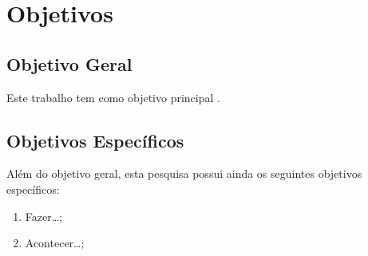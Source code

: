 %
%

\chapter{Objetivos}\label{cap_objetivos}

\section{Objetivo Geral}


Este trabalho tem como objetivo principal \objetivoGeral.

\section{Objetivos Específicos}

Além do objetivo geral, esta pesquisa possui ainda os seguintes objetivos
específicos:

\begin{enumerate}
  \item Fazer\ldots;
  \item Acontecer\ldots;
\end{enumerate}